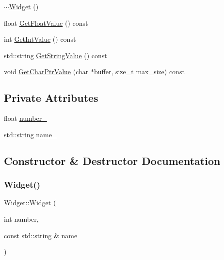 \begin{DoxyCompactItemize}
\item 
\mbox{\hyperlink{class_widget_aa24f66bcbaaec6d458b0980e8c8eae65}{$\sim$\+Widget}} ()
\item 
float \mbox{\hyperlink{class_widget_abf639d975e02cabda8132873aca1a333}{Get\+Float\+Value}} () const
\item 
int \mbox{\hyperlink{class_widget_a15e7d0423020a7a98063a749fb97bdd3}{Get\+Int\+Value}} () const
\item 
std\+::string \mbox{\hyperlink{class_widget_a7a6e3a7fca3a9373f631c94dc1494d22}{Get\+String\+Value}} () const
\item 
void \mbox{\hyperlink{class_widget_a50791a556979f22f5593383143c7f815}{Get\+Char\+Ptr\+Value}} (char $\ast$buffer, size\+\_\+t max\+\_\+size) const
\end{DoxyCompactItemize}
\subsection*{Private Attributes}
\begin{DoxyCompactItemize}
\item 
float \mbox{\hyperlink{class_widget_a27a2b3fd66372d5731fa9a6bcaab755b}{number\+\_\+}}
\item 
std\+::string \mbox{\hyperlink{class_widget_a1d2f74810f3f912270a681e0671a7a55}{name\+\_\+}}
\end{DoxyCompactItemize}


\subsection{Constructor \& Destructor Documentation}
\mbox{\label{class_widget_ab573b75a8a69d29c298af2485fb9cda9}} 
\subsubsection{\texorpdfstring{Widget()}{Widget()}\hspace{0.1cm}{\footnotesize\ttfamily [1/3]}}
{\footnotesize\ttfamily Widget\+::\+Widget (\begin{DoxyParamCaption}\item[{int}]{number,  }\item[{const std\+::string \&}]{name }\end{DoxyParamCaption})}

\mbox{\label{class_widget_aa24f66bcbaaec6d458b0980e8c8eae65}} 
